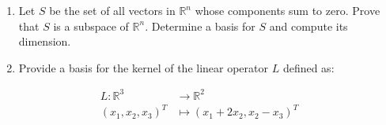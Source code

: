 \begin{enumerate}
\def\labelenumi{\alph{enumi}.}
\tightlist
\item
  Let \(S\) be the set of all vectors in \(\mathbb{R}^n\) whose
  components sum to zero. Prove that \(S\) is a subspace of
  \(\mathbb{R}^n\). Determine a basis for \(S\) and compute its
  dimension.
\item
  Provide a basis for the kernel of the linear operator \(L\) defined
  as:
\end{enumerate}

\begin{align*}
    L: \mathbb{R}^3 &\to \mathbb{R}^2 \\

  \left(x_1, x_2, x_3\right)^{T} &\mapsto \left(x_1 + 2x_2, x_2 - x_3\right)^T
  \end{align*}
